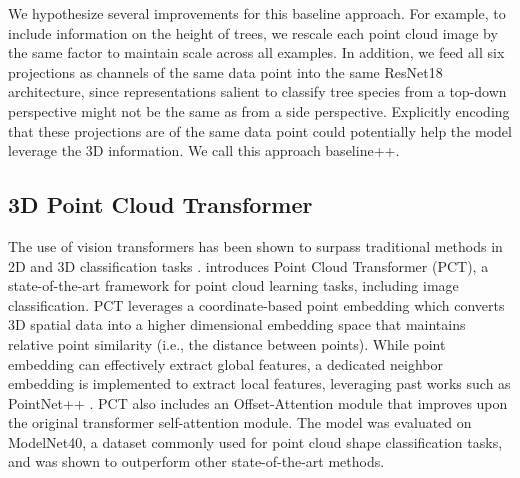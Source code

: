 \documentclass[letterpaper]{article} %
\begin{document}
We hypothesize several improvements for this baseline approach. For example, to include information on the height of trees, we rescale each point cloud image by the same factor to maintain scale across all examples. In addition, we feed all six projections as channels of the same data point into the same ResNet18 architecture, since representations salient to classify tree species from a top-down perspective might not be the same as from a side perspective. Explicitly encoding that these projections are of the same data point could potentially help the model leverage the 3D information. We call this approach baseline++.

\subsection{3D Point Cloud Transformer}



The use of vision transformers has been shown to surpass traditional methods in 2D and 3D classification tasks \cite{lu2022survey}. \citealt{guo2021} introduces Point Cloud Transformer (PCT), a state-of-the-art framework for point cloud learning tasks, including image classification. PCT leverages a coordinate-based point embedding which converts 3D spatial data into a higher dimensional embedding space that maintains relative point similarity (i.e., the distance between points). While point embedding can effectively extract global features, a dedicated neighbor embedding is implemented to extract local features, leveraging past works such as PointNet++ \cite{pointnetplusplus}. PCT also includes an Offset-Attention module that improves upon the original transformer self-attention module. The model was evaluated on ModelNet40, a dataset commonly used for point cloud shape classification tasks, and was shown to outperform other state-of-the-art methods. 
\end{document}
